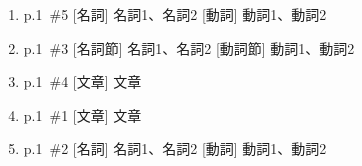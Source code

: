 \documentclass[a4paper,11pt]{jsarticle}
\begin{document}
\begin{enumerate}
  \setlength{\itemsep}{2truecm}
  \item
    p.1~\#5  [名詞] 名詞1、名詞2  [動詞] 動詞1、動詞2
  \item
    p.1~\#3  [名詞節] 名詞1、名詞2  [動詞節] 動詞1、動詞2
  \item
    p.1~\#4 [文章] 文章
  \item
    p.1~\#1 [文章] 文章
  \item
    p.1~\#2  [名詞] 名詞1、名詞2  [動詞] 動詞1、動詞2
\end{enumerate}
\end{document}
